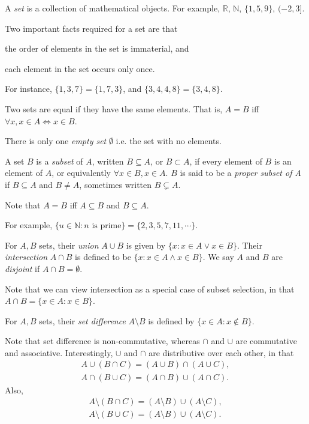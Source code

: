 \documentclass[12pt]{article}
\begin{document}
A \emph{set} is a collection of mathematical objects.
For example, $\mathbb{R}$, $\mathbb{N}$, $\{1,5,9\}$, $(-2,3]$.

Two important facts required for a set are that 
\begin{compactenum}
\item the order of elements in the set is immaterial, and
\item each element in the set occurs only once.
\end{compactenum}

For instance, $\{1,3,7\} = \{1,7,3\}$, and $\{3,4,4,8\} = \{3,4,8\}$.

\begin{definition}
    Two sets are equal if they have the same elements. 
    That is, $A = B$ iff $\forall x, x \in A \iff x \in B$.
\end{definition}
There is only one \emph{empty set} $\emptyset$ i.e. the set with no elements.

\begin{definition}
    A set $B$ is a \emph{subset} of $A$, written $B \subseteq A$, or $B \subset A$,
    if every element of $B$ is an element of $A$, or equivalently $\forall x \in B, x \in A$.
    $B$ is said to be a \emph{proper subset of A} if $B \subseteq A$ and $B \ne A$,
    sometimes written $B \subsetneq A$.
\end{definition}

Note that $A = B$ iff $A \subseteq B$ and $B \subseteq A$.


For example, $\{u \in \mathbb{N} : n\text{ is prime}\} = \{2,3,5,7,11,\cdots\}$.

\begin{definition}
    For $A,B$ sets, their \emph{union} $A \cup B$ is
    given by $\{x : x \in A \lor x \in B\}$.
    Their \emph{intersection} $A \cap B$ is defined to be
    $\{x : x \in A \land x \in B\}$.
    We say $A$ and $B$ are \emph{disjoint} if $A \cap B = \emptyset$.
\end{definition}

Note that we can view intersection as a special case of subset selection,
in that $A \cap B = \{x \in A : x \in B\}$.

\begin{definition}
    For $A,B$ sets, their \emph{set difference} $A \setminus B$ is defined by $\{x \in A : x \notin B\}$.
\end{definition}
Note that set difference is non-commutative, whereas $\cap$ and $\cup$ 
are commutative and associative.
Interestingly, $\cup$ and $\cap$ are distributive over each other, in that
\begin{align*}
    A \cup (B \cap C) = (A \cup B) \cap (A \cup C),\\
    A \cap (B \cup C) = (A \cap B) \cup (A \cap C).
\end{align*}
Also,
\begin{align*}
    A \setminus (B \cap C) = (A \setminus B) \cup (A \setminus C),\\
    A \setminus (B \cup C) = (A \setminus B) \cup (A \setminus C).
\end{align*}
\end{document}
